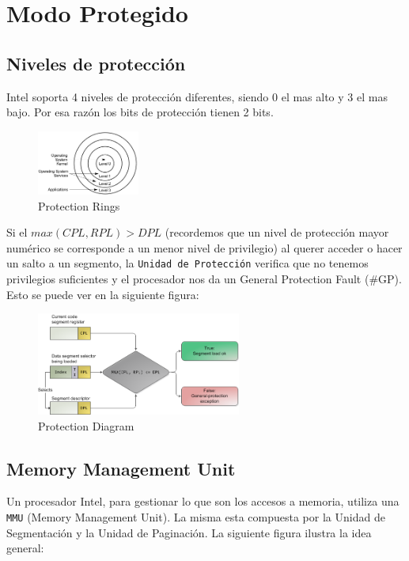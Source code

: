 \section{Modo Protegido}

\subsection{Niveles de protección}

Intel soporta 4 niveles de protección diferentes, siendo 0 el mas alto y 3 el mas bajo. Por esa razón los bits de protección tienen 2 bits.

\begin{figure}[h!]
  \centering
    \includegraphics[width=0.3\textwidth]{images/protection_rings}
  \caption{Protection Rings}
\end{figure}

Si el $max(CPL, RPL) > DPL$ (recordemos que un nivel de protección mayor numérico se corresponde a un menor nivel de privilegio) al querer acceder o hacer un salto a un segmento, la \texttt{Unidad de Protección} verifica que no tenemos privilegios suficientes y el procesador nos da un General Protection Fault (\#GP). Esto se puede ver en la siguiente figura:

\begin{figure}[H]
  \centering
    \includegraphics[width=0.6\textwidth]{images/protection}
  \caption{Protection Diagram}
\end{figure}

\subsection{Memory Management Unit}

Un procesador Intel, para gestionar lo que son los accesos a memoria, utiliza una \texttt{MMU} (Memory Management Unit). La misma esta compuesta por la Unidad de Segmentación y la Unidad de Paginación. La siguiente figura ilustra la idea general:


